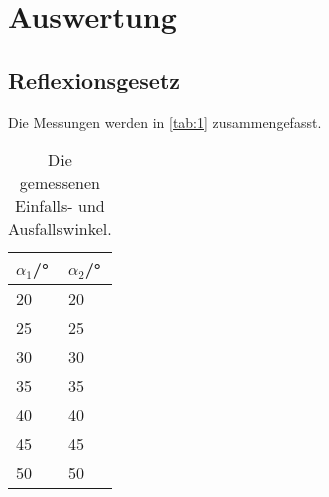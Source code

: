 \section{Auswertung}
\label{sec:Auswertung}

\subsection{Reflexionsgesetz}
Die Messungen werden in \autoref{tab:1} zusammengefasst.
\begin{table}[H]
  \centering
  \caption{Die gemessenen Einfalls- und Ausfallswinkel.}
  \begin{tabular}{l|l}
  $\alpha_1$/° & $\alpha_2$/°\\\hline
  20 & 20\\
  25 & 25\\
  30 & 30\\
  35 & 35\\
  40 & 40\\
  45 & 45\\
  50 & 50\\\hline
  \end{tabular}
  \label{tab:1}
\end{table}

